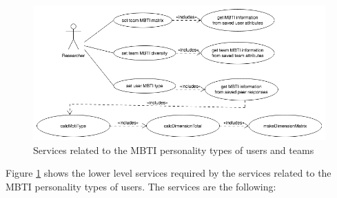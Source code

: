 \begin{figure}[htb]
\begin{center}
  \includegraphics[width=\textwidth,keepaspectratio=true]{MBTIscope}
\end{center}
\caption{Services related to the MBTI personality types of users and teams\label{fig:mbti_functionalRequirements}}
\end{figure}

Figure \ref{fig:mbti_functionalRequirements} shows the lower level services required by the services related to the MBTI personality types of users. The services are the following:


